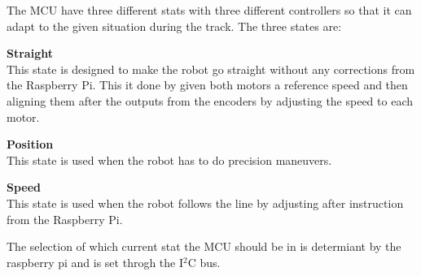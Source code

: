 The MCU have three different stats with three different controllers so that it can adapt to the given situation during the track. The three states are:

\begin{itemize}
	\begin{item}
		\textbf{Straight}\\ This state is designed to make the robot go straight without any corrections from the Raspberry Pi. This it done by given both motors a reference speed and then aligning them after the outputs from the encoders by adjusting the speed to each motor. 
	\end{item}
	
	\begin{item}
		\textbf{Position}\\This state is used when the robot has to do precision maneuvers. 
	\end{item}
	
	\begin{item}
		\textbf{Speed}\\This state is used when the robot follows the line by adjusting after instruction from the Raspberry Pi.
	\end{item}

\end{itemize}

The selection of which current stat the MCU should be in is determiant by the raspberry pi and is set throgh the I$^2$C bus.


